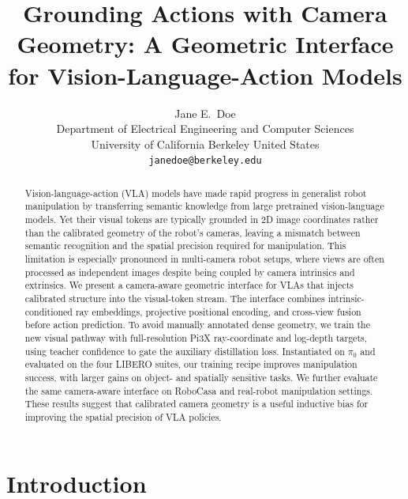 \documentclass{article}
\title{Grounding Actions with Camera Geometry: A Geometric Interface for Vision-Language-Action Models}
\author{
  Jane E.~Doe\\
  Department of Electrical Engineering and Computer Sciences\\
  University of California Berkeley
  United States\\
  \texttt{janedoe@berkeley.edu} \\
}
\begin{document}
\maketitle


\begin{abstract}
Vision-language-action (VLA) models have made rapid progress in generalist robot manipulation by transferring semantic knowledge from large pretrained vision-language models. Yet their visual tokens are typically grounded in 2D image coordinates rather than the calibrated geometry of the robot's cameras, leaving a mismatch between semantic recognition and the spatial precision required for manipulation. This limitation is especially pronounced in multi-camera robot setups, where views are often processed as independent images despite being coupled by camera intrinsics and extrinsics. We present a camera-aware geometric interface for VLAs that injects calibrated structure into the visual-token stream. The interface combines intrinsic-conditioned ray embeddings, projective positional encoding, and cross-view fusion before action prediction. To avoid manually annotated dense geometry, we train the new visual pathway with full-resolution Pi3X ray-coordinate and log-depth targets, using teacher confidence to gate the auxiliary distillation loss. Instantiated on $\pi_0$ and evaluated on the four LIBERO suites, our training recipe improves manipulation success, with larger gains on object- and spatially sensitive tasks. We further evaluate the same camera-aware interface on RoboCasa and real-robot manipulation settings. These results suggest that calibrated camera geometry is a useful inductive bias for improving the spatial precision of VLA policies.

\end{abstract}



\section{Introduction}
\end{document}
